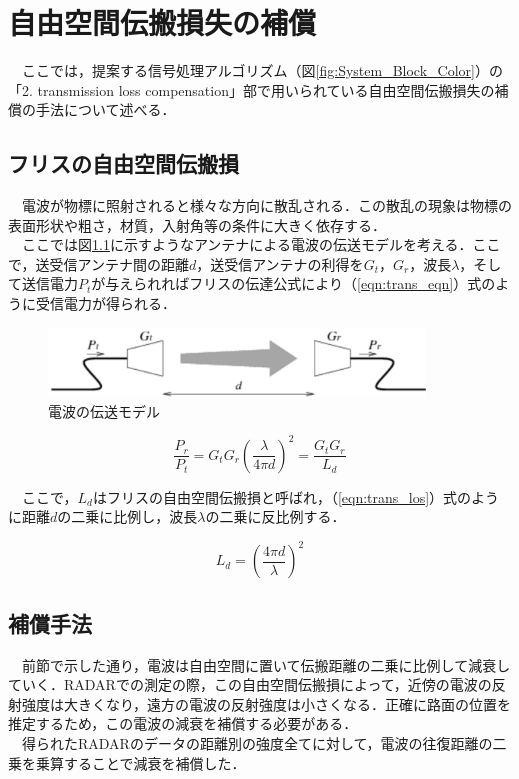 \chapter{自由空間伝搬損失の補償}
　ここでは，提案する信号処理アルゴリズム（図\ref{fig:System_Block_Color}）の「2. transmission loss compensation」部で用いられている自由空間伝搬損失の補償の手法について述べる．

\section{フリスの自由空間伝搬損}
　電波が物標に照射されると様々な方向に散乱される．この散乱の現象は物標の表面形状や粗さ，材質，入射角等の条件に大きく依存する．\\
　ここでは図\ref{fig:trans_model}に示すようなアンテナによる電波の伝送モデルを考える．ここで，送受信アンテナ間の距離$d$，送受信アンテナの利得を$G_t$，$G_r$，波長$\lambda$，そして送信電力$P_t$が与えられればフリスの伝達公式により（\ref{eqn:trans_eqn}）式のように受信電力が得られる\cite{RADAR_book}．

\begin{figure}[H]
    \centering
    \includegraphics[width=10cm]{./fig/trans_model.png}
    \caption{電波の伝送モデル}
    \label{fig:trans_model}
\end{figure}

\begin{equation}
    \frac{P_r}{P_t} = G_t G_r \left(\frac{\lambda}{4 \pi d}\right)^2 = \frac{G_t G_r}{L_d}
    \label{eqn:trans_eqn}
\end{equation}


　ここで，$L_d$はフリスの自由空間伝搬損と呼ばれ，（\ref{eqn:trans_los}）式のように距離$d$の二乗に比例し，波長$\lambda$の二乗に反比例する．

\begin{equation}
L_d = \left(\frac{4 \pi d}{\lambda}\right)^2
\label{eqn:trans_los}
\end{equation}

\section{補償手法}
　前節で示した通り，電波は自由空間に置いて伝搬距離の二乗に比例して減衰していく．RADARでの測定の際，この自由空間伝搬損によって，近傍の電波の反射強度は大きくなり，遠方の電波の反射強度は小さくなる．正確に路面の位置を推定するため，この電波の減衰を補償する必要がある．\\
　得られたRADARのデータの距離別の強度全てに対して，電波の往復距離の二乗を乗算することで減衰を補償した．
